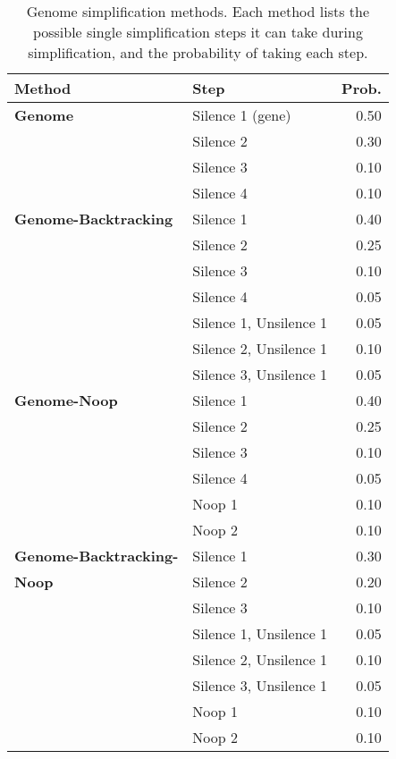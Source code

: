 \begin{table}[t]
	\centering
	\caption{Genome simplification methods. Each method lists the possible single simplification steps it can take during simplification, and the probability of taking each step.}
	\label{table:genome-methods}
	\begin{tabu} to \textwidth {l l r}
		\toprule
		\textbf{Method} & \textbf{Step} & \textbf{Prob.}  \\
		\midrule
		\textbf{Genome} & Silence 1 (gene) & 0.50 \\
		       & Silence 2 & 0.30 \\
		       & Silence 3 & 0.10 \\
		       & Silence 4 & 0.10 \\
		\midrule
		\textbf{Genome-Backtracking}
		       & Silence 1 & 0.40 \\
		       & Silence 2 & 0.25 \\
		       & Silence 3 & 0.10 \\
		       & Silence 4 & 0.05 \\
		       & Silence 1, Unsilence 1 & 0.05 \\
		       & Silence 2, Unsilence 1 & 0.10 \\
		       & Silence 3, Unsilence 1 & 0.05 \\
		\midrule
		\textbf{Genome-Noop}
		       & Silence 1 & 0.40 \\
		       & Silence 2 & 0.25 \\
		       & Silence 3 & 0.10 \\
		       & Silence 4 & 0.05 \\
		       & Noop 1 & 0.10 \\
		       & Noop 2 & 0.10 \\
		\midrule
		\textbf{Genome-Backtracking-}
		       & Silence 1 & 0.30 \\
		  \textbf{Noop} & Silence 2 & 0.20 \\
		       & Silence 3 & 0.10 \\
		       & Silence 1, Unsilence 1 & 0.05 \\
		       & Silence 2, Unsilence 1 & 0.10 \\
		       & Silence 3, Unsilence 1 & 0.05 \\
		       & Noop 1 & 0.10 \\
		       & Noop 2 & 0.10 \\
		\bottomrule
	\end{tabu}
\end{table}

